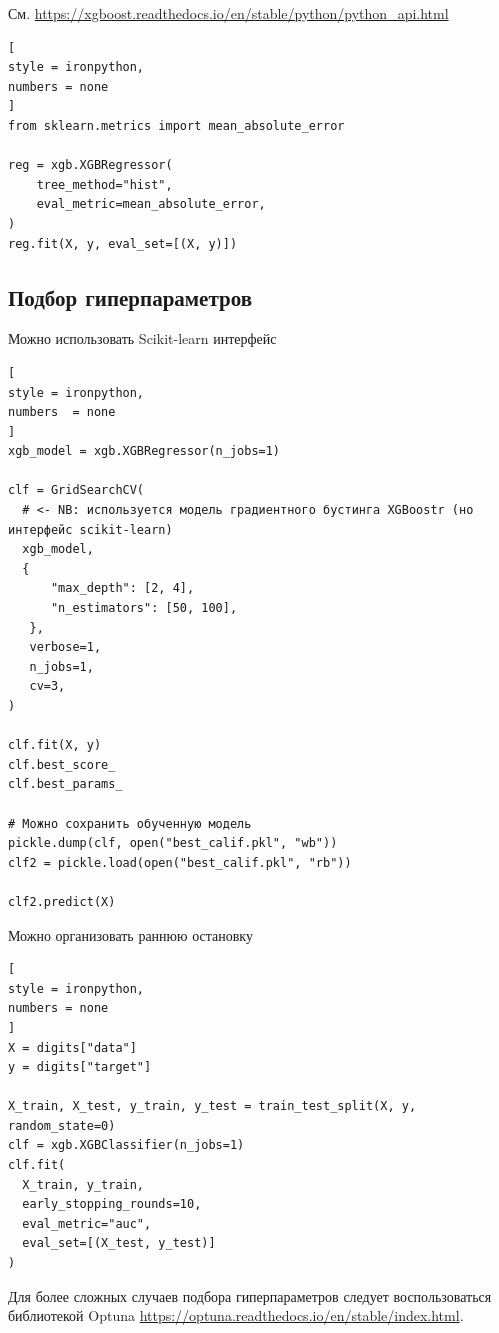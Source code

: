 \documentclass[%
	11pt,
	a4paper,
	utf8,
		]{article}
\begin{document}
См. \url{https://xgboost.readthedocs.io/en/stable/python/python_api.html}

\begin{lstlisting}[
style = ironpython,
numbers = none
]
from sklearn.metrics import mean_absolute_error

reg = xgb.XGBRegressor(
    tree_method="hist",
    eval_metric=mean_absolute_error,
)
reg.fit(X, y, eval_set=[(X, y)])
\end{lstlisting}

\subsection{Подбор гиперпараметров}

Можно использовать Scikit-learn интерфейс
\begin{lstlisting}[
style = ironpython,
numbers  = none
]
xgb_model = xgb.XGBRegressor(n_jobs=1)

clf = GridSearchCV(
  # <- NB: используется модель градиентного бустинга XGBoostr (но интерфейс scikit-learn)
  xgb_model,
  {
      "max_depth": [2, 4],
      "n_estimators": [50, 100],
   },
   verbose=1,
   n_jobs=1,
   cv=3,
)

clf.fit(X, y)
clf.best_score_
clf.best_params_

# Можно сохранить обученную модель
pickle.dump(clf, open("best_calif.pkl", "wb"))
clf2 = pickle.load(open("best_calif.pkl", "rb"))

clf2.predict(X)
\end{lstlisting}

Можно организовать раннюю остановку
\begin{lstlisting}[
style = ironpython,
numbers = none
]
X = digits["data"]
y = digits["target"]

X_train, X_test, y_train, y_test = train_test_split(X, y, random_state=0)
clf = xgb.XGBClassifier(n_jobs=1)
clf.fit(
  X_train, y_train,
  early_stopping_rounds=10,
  eval_metric="auc",
  eval_set=[(X_test, y_test)]
)
\end{lstlisting}

Для более сложных случаев подбора гиперпараметров следует воспользоваться библиотекой Optuna \url{https://optuna.readthedocs.io/en/stable/index.html}.
\end{document}
